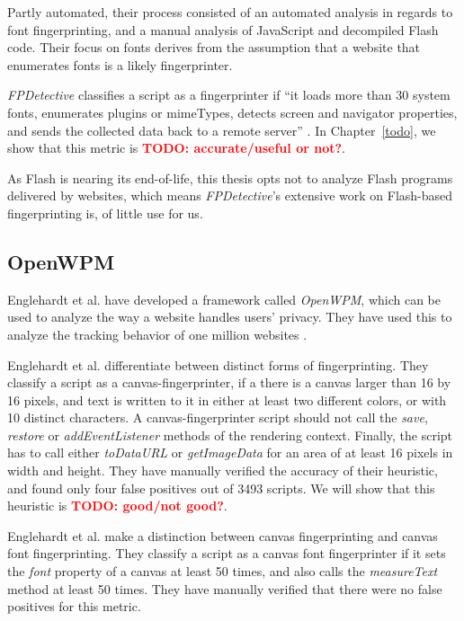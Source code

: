 \documentclass[
    fontsize=12pt,
    headings=small,
    parskip=half,
    bibliography=totoc,
    numbers=noenddot,
    open=any
    ]{scrreprt}
\newcommand{\todo}[1]{\textcolor{red}{\textbf{TODO: #1}}}
\begin{document}
Partly automated, their process consisted of an automated analysis in regards to font fingerprinting,
and a manual analysis of JavaScript and decompiled Flash code.
Their focus on fonts derives from the assumption that a website that
enumerates fonts is a likely fingerprinter.

\textit{FPDetective} classifies a script as a fingerprinter if ``it loads more than 30 system fonts, enumerates plugins
or mimeTypes, detects screen and navigator properties, and sends the collected data back to a remote server''
\cite{DBLP:conf/ccs/AcarJNDGPP13}.
In Chapter~\ref{todo}, we show that this metric is \todo{accurate/useful or not?}.

As Flash is nearing its end-of-life, this thesis opts not to analyze Flash programs
delivered by websites, which means \textit{FPDetective}'s extensive work on Flash-based fingerprinting
is, of little use for us.


\subsection{OpenWPM}
\label{section:openwpm}
Englehardt et al. have developed a framework called \textit{OpenWPM}, which can be used to analyze the way a website
handles users' privacy. They have used this to analyze the tracking behavior of one million websites
\cite{DBLP:conf/ccs/EnglehardtN16,englehardt2016census}.

Englehardt et al. differentiate between distinct forms of fingerprinting.
They classify a script as a canvas-fingerprinter, if a there is a canvas larger than 16 by 16 pixels, and text is
written to it in either at least two different colors, or with 10 distinct characters.
A canvas-fingerprinter script should not call the \textit{save}, \textit{restore} or \textit{addEventListener}
methods of the rendering context. Finally, the script has to call either \textit{toDataURL}
or \textit{getImageData} for an area of at least 16 pixels in width and height.
They have manually verified the accuracy of their heuristic, and found only four false positives
out of 3493 scripts.
We will show that this heuristic is \todo{good/not good?}.

Englehardt et al. make a distinction between canvas fingerprinting and canvas font fingerprinting.
They classify a script as a canvas font fingerprinter if it sets the \textit{font} property
of a canvas at least 50 times, and also calls the \textit{measureText} method at least 50 times.
They have manually verified that there were no false positives for this metric.
\end{document}
